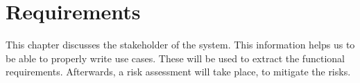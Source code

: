 \chapter{Requirements}
\label{ch:requirements}
This chapter discusses the stakeholder of the system. This information helps us to be able to properly write use cases. These will be used to extract the functional requirements. Afterwards, a risk assessment will take place, to mitigate the risks.



%













% 


